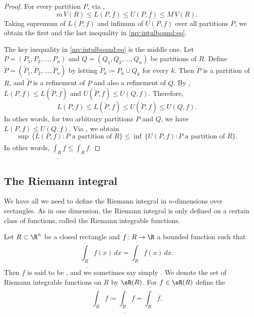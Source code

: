 \begin{proof}
For every partition $P$, via ,
\begin{equation*}
m\,V(R) \leq L(P,f) \leq U(P,f) \leq M\,V(R).
\end{equation*}
Taking supremum of $L(P,f)$ and infimum of $U(P,f)$ over all partitions $P$,
we obtain the first and the last inequality in
\eqref{mv:intulbound:eq}.

The key inequality in
\eqref{mv:intulbound:eq}
is the middle one.
Let $P=(P_1,P_2,\ldots,P_n)$ and
$Q=(Q_1,Q_2,\ldots,Q_n)$
be partitions of $R$.  Define 
$\widetilde{P} = ( \widetilde{P}_1,\widetilde{P}_2,\ldots,\widetilde{P}_n )$
by letting
$\widetilde{P}_k \coloneqq P_k \cup Q_k$ for every $k$.
Then $\widetilde{P}$ is a partition of $R$,
and $\widetilde{P}$ is a refinement of $P$ and also a refinement of $Q$.
By ,
$L(P,f) \leq L(\widetilde{P},f)$ and
$U(\widetilde{P},f) \leq U(Q,f)$.  Therefore,
\begin{equation*}
L(P,f) \leq L(\widetilde{P},f) \leq U(\widetilde{P},f) \leq U(Q,f) .
\end{equation*}
In other words, for two arbitrary partitions $P$ and $Q$, we have
$L(P,f) \leq U(Q,f)$.  
Via ,
we obtain
\begin{equation*}
\sup \, \bigl\{ L(P,f) : P \text{ a partition of } R \bigl\}
\leq
\inf \, \bigl\{ U(P,f) : P \text{ a partition of } R \bigl\} .
\end{equation*}
In other words, $\underline{\int_R} f \leq \overline{\int_R} f$.
\end{proof}

\subsection{The Riemann integral}

We have all we need to
define the Riemann integral in $n$-dimensions over rectangles.
As in one dimension, the Riemann
integral is only defined on a certain class of functions, called the
Riemann integrable functions.

\begin{defn}
Let $R \subset \R^n$ be a closed rectangle and
$f \colon R \to \R$ a bounded function such that
\begin{equation*}
\underline{\int_R} f(x)\,dx = \overline{\int_R} f(x)\,dx .
\end{equation*}
Then $f$ is said to be \emph{},
and we sometimes say simply \emph{}.
We denote the set of Riemann integrable functions on $R$
by $\sR(R)$.
For $f \in \sR(R)$ define
the \emph{}
\begin{equation*}
\int_R f \coloneqq 
\underline{\int_R} f = \overline{\int_R} f .
\end{equation*}
\end{defn}

